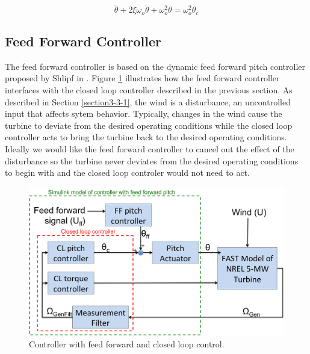 \begin{equation}
	\ddot{\theta } + 2\xi \omega_o \dot{\theta} + \omega_{o}^{2}\theta = \omega_{o}^{2}\theta_c \label{eq3-1}
\end{equation}




\subsection{Feed Forward Controller} \label{section3-3-3}

The feed forward controller is based on the dynamic feed forward pitch controller proposed by Shlipf in \cite{schlipf2010}. Figure \ref{fig3-10} illustrates how the feed forward controller interfaces with the closed loop controller described in the previous section. As described in Section \ref{section3-3-1}, the wind is a disturbance, an uncontrolled input that affects sytem behavior. Typically, changes in the wind cause the turbine to deviate from the desired operating conditions while the closed loop controller acts to bring the turbine back to the desired operating conditions. Ideally we would like the feed forward controller to cancel out the effect of the disturbance so the turbine never deviates from the desired operating conditions to begin with and the closed loop controler would not need to act.

 \begin{figure}[htbp]
	\centering
		\includegraphics[width=\linewidth]{Figures/ch3Figures/fig3-10.png}
		
	\caption{Controller with feed forward and closed loop control.}
	\label{fig3-10}
\end{figure}

